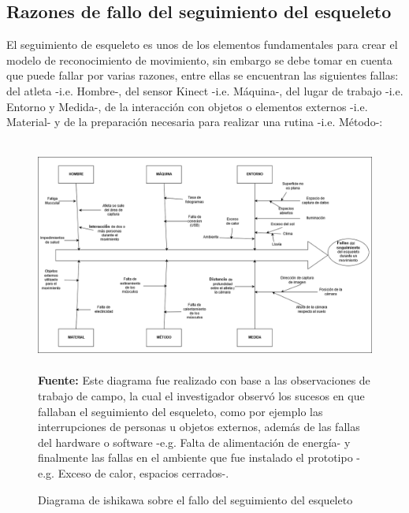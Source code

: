 \begin{landscape}
\section{Razones de fallo del seguimiento del esqueleto}
El seguimiento de esqueleto es unos de los  elementos fundamentales para crear el modelo de reconocimiento de movimiento, sin embargo se debe tomar en cuenta que puede fallar por varias razones, entre ellas se encuentran las siguientes fallas: del atleta -i.e. Hombre-, del sensor Kinect -i.e. M\'aquina-, del lugar de trabajo -i.e. Entorno y  Medida-, de la interacci\'on  con objetos o elementos externos -i.e. Material- y de la preparaci\'on necesaria para realizar una rutina -i.e. M\'etodo-:
\begin{figure}[H]
	\caption{Diagrama de ishikawa sobre el fallo del seguimiento del esqueleto}
	\label{fig:ishikawa}
	\centering
	\includegraphics[width=500px,height=290px]{graphics/resultados/Ishi-SeguimientoDeEsqueleto.PNG} \\
	\textbf{Fuente:} Este diagrama fue realizado con base a las observaciones de trabajo de campo, la cual el investigador observ\'o los sucesos en que fallaban el seguimiento del esqueleto, como por ejemplo las interrupciones de personas u objetos externos, adem\'as de las fallas del hardware o software -e.g. Falta de alimentaci\'on de energ\'ia- y finalmente las fallas en el ambiente que fue instalado el prototipo -e.g. Exceso de calor, espacios cerrados-.
\end{figure}
\end{landscape}

